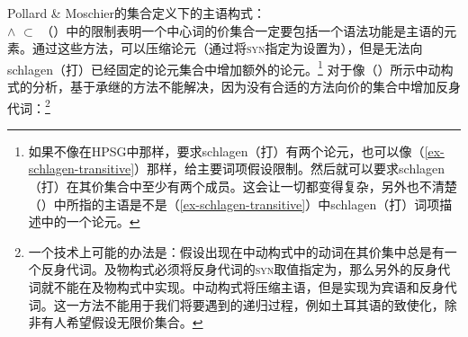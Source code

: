 \ea
Pollard \& Moschier的集合定义下的主语构式：\\
 $\wedge$  $\subset$ 
\z
（）中的限制表明一个中心词的价集合一定要包括一个语法功能是主语的元素。通过这些方法，可以压缩论元（通过将\textsc{syn}指定为设置为），但是无法向schlagen（打）已经固定的论元集合中增加额外的论元。\footnote{%
如果不像在HPSG中那样，要求schlagen（打）有两个论元，也可以像（\ref{ex-schlagen-transitive}）那样，给主要词项假设限制。然后就可以要求schlagen（打）在其价集合中至少有两个成员。这会让一切都变得复杂，另外也不清楚（）中所指的主语是不是（\ref{ex-schlagen-transitive}）中schlagen（打）词项描述中的一个论元。}
对于像（）所示中动构式的分析，基于承继的方法不能解决，因为没有合适的方法向价的集合中增加反身代词：\footnote{
一个技术上可能的办法是：假设出现在中动构式中的动词在其价集中总是有一个反身代词。及物构式必须将反身代词的\textsc{syn}取值指定为，那么另外的反身代词就不能在及物构式中实现。中动构式将压缩主语，但是实现为宾语和反身代词。这一方法不能用于我们将要遇到的递归过程，例如土耳其语的致使化，除非有人希望假设无限价集合。
}
